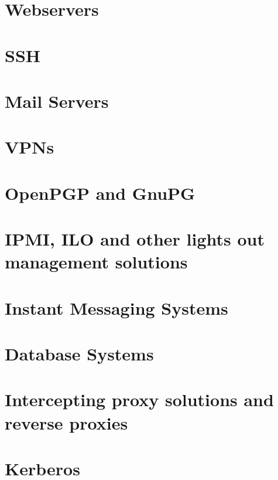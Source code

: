 \section{Webservers}
\label{sec:webservers}

\section{SSH}
\label{sec:ssh}

\section{Mail Servers}
\label{sec:mail-servers}

\section{VPNs}
\label{sec:vpns}

\section{OpenPGP and GnuPG}
\label{sec:openpgp-gnupg}

%
\section{IPMI, ILO and other lights out management solutions}
\label{sec:ipmi-ilo-other}

\section{Instant Messaging Systems}
\label{sec:inst-mess-syst}

\section{Database Systems}
\label{sec:database-systems}

\section{Intercepting proxy solutions and reverse proxies}
\label{sec:interc-proxy-solut}

\section{Kerberos}
\label{sec:kerberos}



